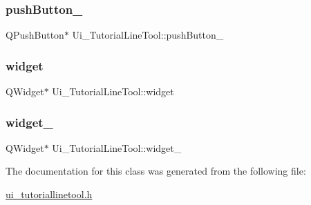 \subsubsection{\texorpdfstring{push\+Button\+\_}{pushButton\_3}}
{\footnotesize\ttfamily Q\+Push\+Button$\ast$ Ui\+\_\+\+Tutorial\+Line\+Tool\+::push\+Button\+\_}

\mbox{\label{class_ui___tutorial_line_tool_a23abf750d7407913b339fc3c355a0f39}} 
\subsubsection{\texorpdfstring{widget}{widget}}
{\footnotesize\ttfamily Q\+Widget$\ast$ Ui\+\_\+\+Tutorial\+Line\+Tool\+::widget}

\mbox{\label{class_ui___tutorial_line_tool_aa75a71bc65f21bf083197dd534bcf95e}} 
\subsubsection{\texorpdfstring{widget\+\_}{widget\_2}}
{\footnotesize\ttfamily Q\+Widget$\ast$ Ui\+\_\+\+Tutorial\+Line\+Tool\+::widget\+\_}



The documentation for this class was generated from the following file\+:\begin{DoxyCompactItemize}
\item 
\hyperlink{ui__tutoriallinetool_8h}{ui\+\_\+tutoriallinetool.\+h}\end{DoxyCompactItemize}
